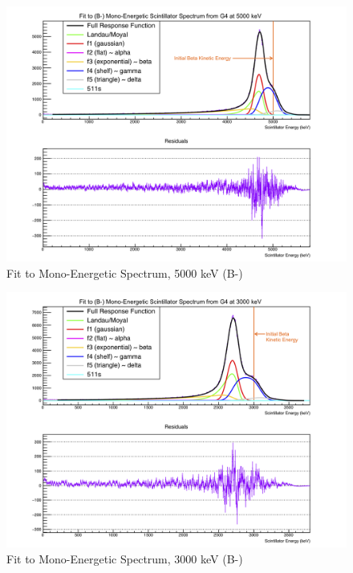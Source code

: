 \begin{figure}[h!!tb]
	\centering
	\includegraphics[width=.999\linewidth]
	{Figures/MonoFit_5000.png}
	\caption[Fit to Mono-Energetic Spectrum, 5000 keV]{Fit to Mono-Energetic Spectrum, 5000 keV (B-)}	
\end{figure}
\begin{figure}[h!!tb]
	\centering
	\includegraphics[width=.999\linewidth]
	{Figures/MonoFit_3000.png}
	\caption[Fit to Mono-Energetic Spectrum, 3000 keV]{Fit to Mono-Energetic Spectrum, 3000 keV (B-)}	
\end{figure}
